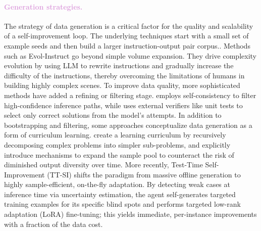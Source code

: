\paragraph{\textcolor{Plum}{Generation strategies.}}
The strategy of data generation is a critical factor for the quality and scalability of a self-improvement loop. 
The underlying techniques start with a small set of example seeds and then build a larger instruction-output pair corpus.\citep{wang2022self, zhao2024selfguidebettertaskspecificinstruction}. Methods such as Evol-Instruct \citep{xu2024wizardlm} go beyond simple volume expansion. They drive complexity evolution by using LLM to rewrite instructions and gradually increase the difficulty of the instructions, thereby overcoming the limitations of humans in building highly complex scenes. To improve data quality, more sophisticated methods have added a refining or filtering stage.  \cite{huang2023large} employs self-consistency to filter high-confidence inference paths, while \cite{singh2023beyond} uses external verifiers like unit tests to select only correct solutions from the model’s attempts. In addition to bootstrapping and filtering, some approaches conceptualize data generation as a form of curriculum learning. \cite{simonds2025ladder} create a learning curriculum by recursively decomposing complex problems into simpler sub-problems, and \cite{qin2025dive} explicitly introduce mechanisms to expand the sample pool to counteract the risk of diminished output diversity over time. More recently, Test-Time Self-Improvement (TT-SI) \citep{acikgoz2025selfimprovingllmagentstesttime} shifts the paradigm from massive offline generation to highly sample-efficient, on-the-fly adaptation. By detecting weak cases at inference time via uncertainty estimation, the agent self-generates targeted training examples for its specific blind spots and performs targeted low-rank adaptation (LoRA) fine-tuning; this yields immediate, per-instance improvements with a fraction of the data cost.

